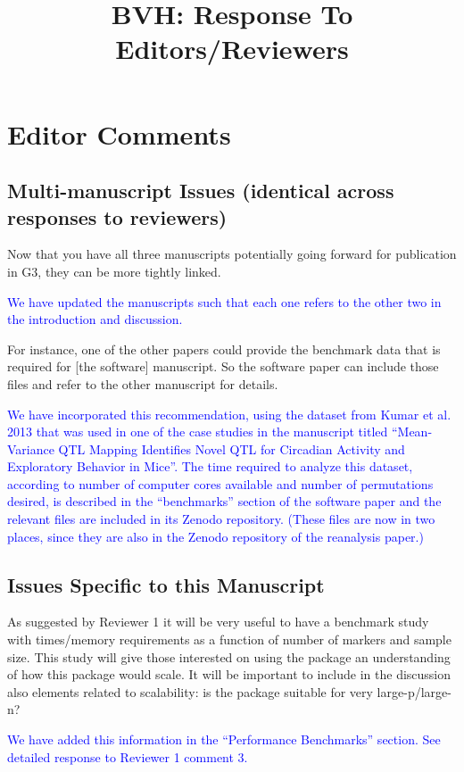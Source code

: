 \documentclass[11pt]{article}
\title{BVH: Response To Editors/Reviewers}
\newcommand{\EditorQuestion}[1]{
  \vspace{5pt}\goodbreak
  \noindent\fbox{Editor:} #1
  \normalfont\par
}
\newcommand{\Response}[1]{
  \goodbreak
  \textcolor{blue}{#1}
  \normalfont\par
}
\begin{document}
\reversemarginpar

\section*{Editor Comments}

\subsection*{Multi-manuscript Issues (identical across responses to reviewers)}

\EditorQuestion{
  Now that you have all three manuscripts potentially going forward for publication in G3, they can be more tightly linked.
}
\Response{
  We have updated the manuscripts such that each one refers to the other two in the introduction and discussion.
}

\EditorQuestion{
   For instance, one of the other papers could provide the benchmark data that is required for [the software] manuscript.
   So the software paper can include those files and refer to the other manuscript for details.
}
\Response{
  We have incorporated this recommendation, using the dataset from Kumar et al. 2013 that was used in one of the case studies in the manuscript titled ``Mean-Variance QTL Mapping Identifies Novel QTL for Circadian Activity and Exploratory Behavior in Mice''.
  The time required to analyze this dataset, according to number of computer cores available and number of permutations desired, is described in the ``benchmarks'' section of the software paper and the relevant files are included in its Zenodo repository.
  (These files are now in two places, since they are also in the Zenodo repository of the reanalysis paper.)
}



\subsection*{Issues Specific to this Manuscript}

\EditorQuestion{
  As suggested by Reviewer 1 it will be very useful to have a benchmark study with times/memory requirements as a function of number of markers and sample size.
  This study will give those interested on using the package an understanding of how this package would scale.
  It will be important to include in the discussion also elements related to scalability: is the package suitable for very large-p/large-n? 
}
\Response{
  We have added this information in the ``Performance Benchmarks'' section.
  See detailed response to Reviewer 1 comment 3.
}
\end{document}
